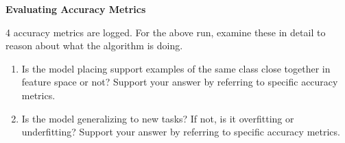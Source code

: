 \item {} {\bf Evaluating Accuracy Metrics}

4 accuracy metrics are logged. For the above run, examine these in detail to reason about what the algorithm is doing.

\begin{enumerate}[label=(\roman*)]
    \item Is the model placing support examples of the same class close together in feature space or not? Support your answer by referring to specific accuracy metrics.
    
    \item Is the model generalizing to new tasks? If not, is it overfitting or underfitting? Support your answer by referring to specific accuracy metrics.
\end{enumerate}